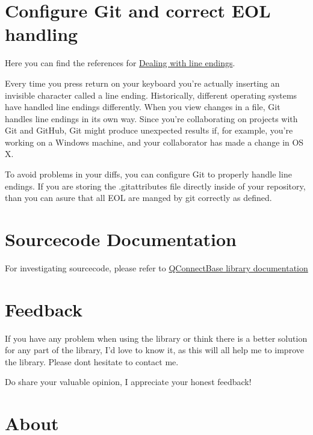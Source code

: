 \hypertarget{description-configure-git-and-correct-eol-handling}{%
\section{Configure Git and correct EOL
handling}\label{description-configure-git-and-correct-eol-handling}}

Here you can find the references for
\href{https://help.github.com/articles/dealing-with-line-endings/}{Dealing
with line endings}.

Every time you press return on your keyboard you're actually inserting
an invisible character called a line ending. Historically, different
operating systems have handled line endings differently. When you view
changes in a file, Git handles line endings in its own way. Since you're
collaborating on projects with Git and GitHub, Git might produce
unexpected results if, for example, you're working on a Windows machine,
and your collaborator has made a change in OS X.

To avoid problems in your diffs, you can configure Git to properly
handle line endings. If you are storing the .gitattributes file directly
inside of your repository, than you can asure that all EOL are manged by
git correctly as defined.

\hypertarget{description-sourcecode-documentation}{%
\section{Sourcecode Documentation}\label{description-sourcecode-documentation}}

For investigating sourcecode, please refer to
\href{../docs/html/index.html}{QConnectBase library documentation}

\hypertarget{description-feedback}{%
\section{Feedback}\label{description-feedback}}

If you have any problem when using the library or think there is a
better solution for any part of the library, I'd love to know it, as
this will all help me to improve the library. Please
don\textquotesingle t hesitate to contact me.

Do share your valuable opinion, I appreciate your honest feedback!

\hypertarget{description-about}{%
\section{About}\label{description-about}}

